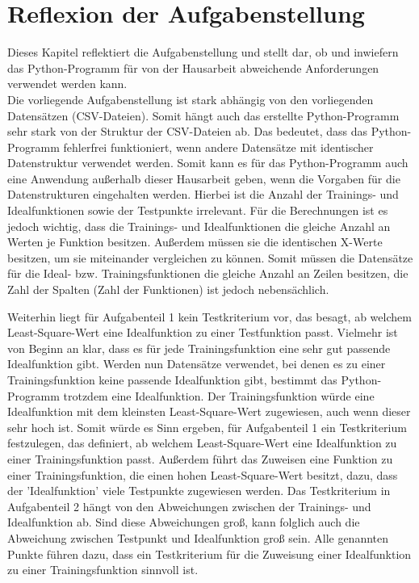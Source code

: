 \documentclass[
    a4paper, 								%
    oneside, 								%
    11pt, 									%
    listof=totoc, 					%
    bibliography=totoc, 		%
    final, 									%
    numbers=noenddot
]{scrreprt}
\begin{document}
\chapter{Reflexion der Aufgabenstellung}
Dieses Kapitel reflektiert die Aufgabenstellung und stellt dar, ob und inwiefern das Python-Programm für von der Hausarbeit abweichende Anforderungen verwendet werden kann.\\
Die vorliegende Aufgabenstellung ist stark abhängig von den vorliegenden Datensätzen (CSV-Dateien). Somit hängt auch das erstellte Python-Programm sehr stark von der Struktur der CSV-Dateien ab. Das bedeutet, dass das Python-Programm fehlerfrei funktioniert, wenn andere Datensätze mit identischer Datenstruktur verwendet werden. Somit kann es für das Python-Programm auch eine Anwendung außerhalb dieser Hausarbeit geben, wenn die Vorgaben für die Datenstrukturen eingehalten werden. Hierbei ist die Anzahl der Trainings- und Idealfunktionen sowie der Testpunkte irrelevant. Für die Berechnungen ist es jedoch wichtig, dass die Trainings- und Idealfunktionen die gleiche Anzahl an Werten je Funktion besitzen. Außerdem müssen sie die identischen X-Werte besitzen, um sie miteinander vergleichen zu können. Somit müssen die Datensätze für die Ideal- bzw. Trainingsfunktionen die gleiche Anzahl an Zeilen besitzen, die Zahl der Spalten (Zahl der Funktionen) ist jedoch nebensächlich.

Weiterhin liegt für Aufgabenteil 1 kein Testkriterium vor, das besagt, ab welchem Least-Square-Wert eine Idealfunktion zu einer Testfunktion passt. Vielmehr ist von Beginn an klar, dass es für jede Trainingsfunktion eine sehr gut passende Idealfunktion gibt. Werden nun Datensätze verwendet, bei denen es zu einer Trainingsfunktion keine passende Idealfunktion gibt, bestimmt das Python-Programm trotzdem eine Idealfunktion. Der Trainingsfunktion würde eine Idealfunktion mit dem kleinsten Least-Square-Wert zugewiesen, auch wenn dieser sehr hoch ist. Somit würde es Sinn ergeben, für Aufgabenteil 1 ein Testkriterium festzulegen, das definiert, ab welchem Least-Square-Wert eine Idealfunktion zu einer Trainingsfunktion passt. 
Außerdem führt das Zuweisen eine Funktion zu einer Trainingsfunktion, die einen hohen Least-Square-Wert besitzt, dazu, dass der 'Idealfunktion' viele Testpunkte zugewiesen werden. Das Testkriterium in Aufgabenteil 2 hängt von den Abweichungen zwischen der Trainings- und Idealfunktion ab. Sind diese Abweichungen groß, kann folglich auch die Abweichung zwischen Testpunkt und Idealfunktion groß sein. Alle genannten Punkte führen dazu, dass ein Testkriterium für die Zuweisung einer Idealfunktion zu einer Trainingsfunktion sinnvoll ist. 
\end{document}
